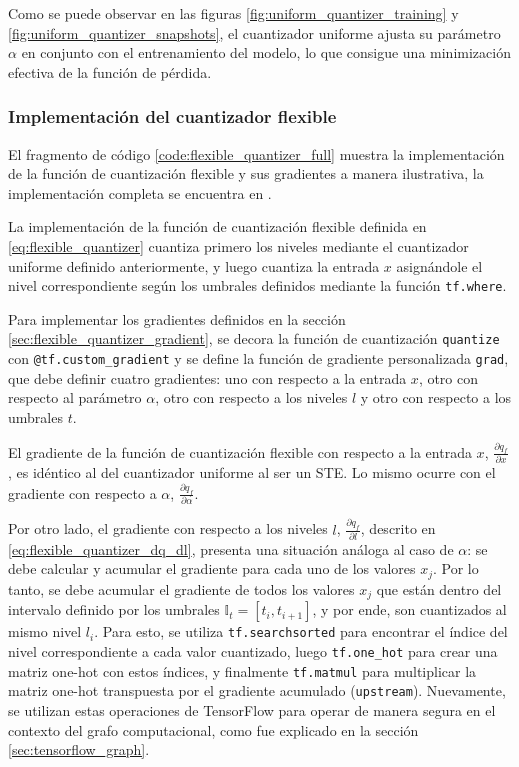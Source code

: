 

Como se puede observar en las figuras \ref{fig:uniform_quantizer_training} y \ref{fig:uniform_quantizer_snapshots}, el cuantizador uniforme ajusta su parámetro $\alpha$ en conjunto con el entrenamiento del modelo, lo que consigue una minimización efectiva de la función de pérdida.

\subsubsection{Implementación del cuantizador flexible}

El fragmento de código \ref{code:flexible_quantizer_full} muestra la implementación de la función de cuantización flexible y sus gradientes a manera ilustrativa, la implementación completa se encuentra en \cite{qtensor_flexible_quantizer}.

La implementación de la función de cuantización flexible definida en \eqref{eq:flexible_quantizer} cuantiza primero los niveles mediante el cuantizador uniforme definido anteriormente, y luego cuantiza la entrada $x$ asignándole el nivel correspondiente según los umbrales definidos mediante la función \texttt{tf.where}.

Para implementar los gradientes definidos en la sección \ref{sec:flexible_quantizer_gradient}, se decora la función de cuantización \texttt{quantize} con \texttt{@tf.custom\_gradient} y se define la función de gradiente personalizada \texttt{grad}, que debe definir cuatro gradientes: uno con respecto a la entrada $x$, otro con respecto al parámetro $\alpha$, otro con respecto a los niveles $l$ y otro con respecto a los umbrales $t$.

El gradiente de la función de cuantización flexible con respecto a la entrada $x$, $\frac{\partial q_{f}}{\partial x}$, es idéntico al del cuantizador uniforme al ser un STE. Lo mismo ocurre con el gradiente con respecto a $\alpha$, $\frac{\partial q_{f}}{\partial \alpha}$.

Por otro lado, el gradiente con respecto a los niveles $l$, $\frac{\partial q_{f}}{\partial l}$, descrito en \eqref{eq:flexible_quantizer_dq_dl}, presenta una situación análoga al caso de $\alpha$: se debe calcular y acumular el gradiente para cada uno de los valores $x_j$. Por lo tanto, se debe acumular el gradiente de todos los valores $x_j$ que est\'an dentro del intervalo definido por los umbrales $\mathbb{I}_t = [t_i, t_{i+1}]$, y por ende, son cuantizados al mismo nivel $l_i$. Para esto, se utiliza \texttt{tf.searchsorted} \cite{tensorflow_searchsorted} para encontrar el índice del nivel correspondiente a cada valor cuantizado, luego \texttt{tf.one\_hot} \cite{tensorflow_one_hot} para crear una matriz one-hot \cite{Goodfellow2016} con estos índices, y finalmente \texttt{tf.matmul} \cite{tensorflow_matmul} para multiplicar la matriz one-hot transpuesta por el gradiente acumulado (\texttt{upstream}). Nuevamente, se utilizan estas operaciones de TensorFlow para operar de manera segura en el contexto del grafo computacional, como fue explicado en la sección \ref{sec:tensorflow_graph}.


